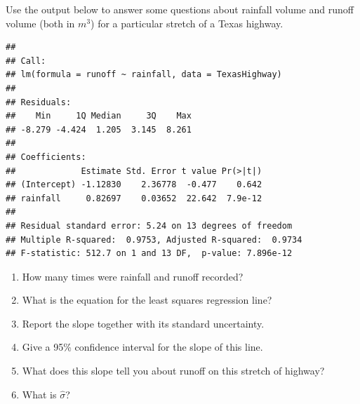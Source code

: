\documentclass[twoside]{book}\usepackage[]{graphicx}\usepackage[]{xcolor}
\makeatletter
\newenvironment{kframe}{%
 \def\at@end@of@kframe{}%
 \ifinner\ifhmode%
  \def\at@end@of@kframe{\end{minipage}}%
  \begin{minipage}{\columnwidth}%
 \fi\fi%
 \def\FrameCommand##1{\hskip\@totalleftmargin \hskip-\fboxsep
 \colorbox{shadecolor}{##1}\hskip-\fboxsep
     \hskip-\linewidth \hskip-\@totalleftmargin \hskip\columnwidth}%
 \MakeFramed {\advance\hsize-\width
   \@totalleftmargin\z@ \linewidth\hsize
   \@setminipage}}%
 {\par\unskip\endMakeFramed%
 \at@end@of@kframe}
\newenvironment{knitrout}{}{} %
\makeatother
\begin{document}
\begin{problem}
	Use the output below to answer some questions about rainfall volume  and 
	runoff volume (both in $m^3$) for a particular stretch of a Texas highway.
\begin{knitrout}
\color{fgcolor}\begin{kframe}
\begin{verbatim}
## 
## Call:
## lm(formula = runoff ~ rainfall, data = TexasHighway)
## 
## Residuals:
##    Min     1Q Median     3Q    Max 
## -8.279 -4.424  1.205  3.145  8.261 
## 
## Coefficients:
##             Estimate Std. Error t value Pr(>|t|)
## (Intercept) -1.12830    2.36778  -0.477    0.642
## rainfall     0.82697    0.03652  22.642  7.9e-12
## 
## Residual standard error: 5.24 on 13 degrees of freedom
## Multiple R-squared:  0.9753,	Adjusted R-squared:  0.9734 
## F-statistic: 512.7 on 1 and 13 DF,  p-value: 7.896e-12
\end{verbatim}
\end{kframe}
\end{knitrout}
	\begin{enumerate}
		\item
			How many times were rainfall and runoff recorded?
		\item
			What is the equation for the least squares regression line?
		\item
			Report the slope together with its standard uncertainty.
		\item
			Give a 95\% confidence interval for the slope of this line.
		\item
			What does this slope tell you about runoff on this
			stretch of highway?
		\item
			What is $\hat\sigma$?
	\end{enumerate}
\end{problem}
\end{document}
